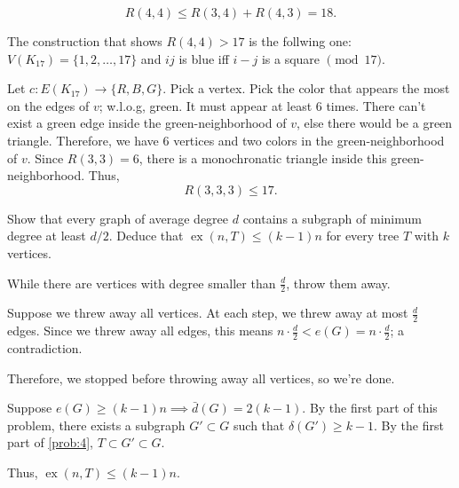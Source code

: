 \documentclass[10pt, a4paper]{article}
\DeclareMathOperator\ex{ex}
\begin{document}
\begin{sol}
	\[
		R(4, 4) \le R(3, 4) + R(4, 3) = 18.
	\]

	The construction that shows $R(4, 4) > 17$ is the follwing one: $V(K_{17}) = \{1, 2, \dots, 17\}$ and $ij$ is blue iff $i - j$ is a square $\pmod{17}$. 
\end{sol}

\begin{sol}
	Let $c: E(K_{17}) \to \{R, B, G\}$. Pick a vertex. Pick the color that appears the most on the edges of $v$; w.l.o.g, green. It must appear at least $6$ times. There can't exist a green edge inside the green-neighborhood of $v$, else there would be a green triangle. Therefore, we have $6$ vertices and two colors in the green-neighborhood of $v$. Since $R(3, 3) = 6$, there is a monochronatic triangle inside this green-neighborhood. Thus, \[
		R(3, 3, 3) \le 17.
	\]

\end{sol}


\newpage
\begin{prob}
	Show that every graph of average degree $d$ contains a subgraph of minimum degree at least $d/2$. Deduce that  $\ex(n, T) \leqslant (k-1)n$ for every tree $T$ with $k$ vertices.
\end{prob}
\begin{sol}	
		While there are vertices with degree smaller than $\frac{d}{2}$, throw them away.

		Suppose we threw away all vertices. At each step, we threw away at most $\frac{d}{2}$ edges. Since we threw away all edges, this means $n \cdot \frac{d}{2} < e(G) = n \cdot \frac{d}{2}$; a contradiction.

		Therefore, we stopped before throwing away all vertices, so we're done. 
\end{sol}

\begin{sol}	
	Suppose $e(G) \geqslant (k-1)n \implies \bar{d}(G) = 2(k-1)$. By the first part of this problem, there exists a subgraph $G' \subset G$ such that $\delta(G') \geqslant k - 1$. By the first part of \cref{prob:4}, $T \subset G' \subset G$.

	Thus, $\ex(n, T) \leqslant (k-1)n$.
\end{sol}
\end{document}
